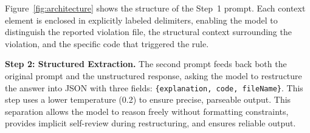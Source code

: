 Figure~\ref{fig:architecture} shows the structure of the Step~1 prompt. Each context element is enclosed in explicitly labeled delimiters, enabling the model to distinguish the reported violation file, the structural context surrounding the violation, and the specific code that triggered the rule.

\textbf{Step 2: Structured Extraction.} The second prompt feeds back both the original prompt and the unstructured response, asking the model to restructure the answer into JSON with three fields: \texttt{\{explanation, code, fileName\}}. This step uses a lower temperature (0.2) to ensure precise, parseable output.
This separation allows the model to reason freely without formatting constraints, provides implicit self-review during restructuring, and ensures reliable output.

